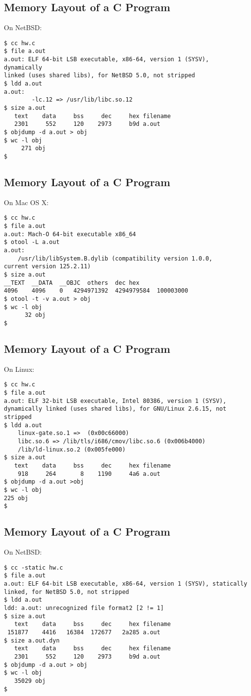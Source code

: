 \documentclass[xga]{xdvislides}
\begin{document}
\subsection{Memory Layout of a C Program}
On NetBSD:
\begin{verbatim}
$ cc hw.c
$ file a.out
a.out: ELF 64-bit LSB executable, x86-64, version 1 (SYSV), dynamically
linked (uses shared libs), for NetBSD 5.0, not stripped
$ ldd a.out
a.out:
        -lc.12 => /usr/lib/libc.so.12
$ size a.out
   text    data     bss     dec     hex filename
   2301     552     120    2973     b9d a.out
$ objdump -d a.out > obj
$ wc -l obj
     271 obj
$
\end{verbatim}

\subsection{Memory Layout of a C Program}
On Mac OS X:
\begin{verbatim}
$ cc hw.c
$ file a.out
a.out: Mach-O 64-bit executable x86_64
$ otool -L a.out
a.out:
	/usr/lib/libSystem.B.dylib (compatibility version 1.0.0,
current version 125.2.11)
$ size a.out
__TEXT	__DATA	__OBJC	others	dec	hex
4096	4096	0	4294971392	4294979584	100003000
$ otool -t -v a.out > obj
$ wc -l obj
      32 obj
$
\end{verbatim}

\subsection{Memory Layout of a C Program}
On Linux:
\begin{verbatim}
$ cc hw.c
$ file a.out
a.out: ELF 32-bit LSB executable, Intel 80386, version 1 (SYSV),
dynamically linked (uses shared libs), for GNU/Linux 2.6.15, not stripped
$ ldd a.out
	linux-gate.so.1 =>  (0x00c66000)
	libc.so.6 => /lib/tls/i686/cmov/libc.so.6 (0x006b4000)
	/lib/ld-linux.so.2 (0x005fe000)
$ size a.out
   text	   data	    bss	    dec	    hex	filename
    918	    264	      8	   1190	    4a6	a.out
$ objdump -d a.out >obj
$ wc -l obj
225 obj
$
\end{verbatim}

\subsection{Memory Layout of a C Program}
On NetBSD:
\begin{verbatim}
$ cc -static hw.c
$ file a.out
a.out: ELF 64-bit LSB executable, x86-64, version 1 (SYSV), statically
linked, for NetBSD 5.0, not stripped
$ ldd a.out
ldd: a.out: unrecognized file format2 [2 != 1]
$ size a.out
   text    data     bss     dec     hex filename
 151877    4416   16384  172677   2a285 a.out
$ size a.out.dyn
   text    data     bss     dec     hex filename
   2301     552     120    2973     b9d a.out
$ objdump -d a.out > obj
$ wc -l obj
   35029 obj
$
\end{verbatim}
\end{document}
